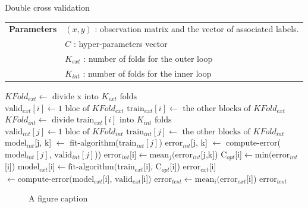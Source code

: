 \documentclass[a4paper,12pt,oneside,final]{report}
\newenvironment{changemargin}[2]{\begin{list}{}{%
\setlength{\topsep}{0pt}%
\setlength{\leftmargin}{0pt}%
\setlength{\rightmargin}{0pt}%
\setlength{\listparindent}{\parindent}%
\setlength{\itemindent}{\parindent}%
\setlength{\parsep}{0pt plus 1pt}%
\addtolength{\leftmargin}{#1}%
\addtolength{\rightmargin}{#2}%
}\item }{\end{list}}
\begin{document}
\begin{algorithm}[H]
     \caption{\small Double cross validation}
     \label{alg:double_cross_val} 
     \begin{algorithmic}
       \STATE \begin{tabular}{@{\hspace{0cm}}p{1.4cm}l}
       \textbf{Parameters}  & $(x, y)$ : observation matrix and the vector of associated labels.\\
           & $C$ : hyper-parameters vector\\
           & $K_{ext}$ : number of folds for the outer loop\\
           & $K_{int}$ : number of folds for the inner loop\\
       \end{tabular}
       \STATE $KFold_{ext} \leftarrow \text{ divide x into } K_{ext} \text{ folds}$\\
         \STATE $\text{valid}_{ext}[i] \leftarrow 1 \text{ bloc of } KFold_{ext}$
         \STATE $\text{train}_{ext}[i] \leftarrow \text{ the other blocks of } KFold_{ext}$
         \STATE $KFold_{int} \leftarrow \text{ divide train}_{ext}[i] \text{ into } K_{int} \text{ folds}$\\
            \STATE $\text{valid}_{int}[j] \leftarrow 1 \text{ bloc of } KFold_{int}$
            \STATE $\text{train}_{int}[j] \leftarrow \text{ the other blocks of } KFold_{int}$
               \STATE $\text{model}_{int}$[j, k] $\leftarrow$ fit-algorithm($\text{train}_{int}[j]$)
               \STATE $\text{error}_{int}$[j, k] $\leftarrow$ compute-error($\text{model}_{int}[j]$, $\text{valid}_{int}[j]$))
            \ENDFOR
         \ENDFOR
         \STATE $\text{error}_{int}$[i]$ \leftarrow  \text{mean}_j( \text{error}_{int}$[j,k])
         \STATE $\text{C}_{opt}$[i]$     \leftarrow  \text{min}( \text{error}_{int}$[i])
         \STATE $\text{model}_{ext}$[i]$ \leftarrow  \text{fit-algorithm}( \text{train}_{ext}$[i], $\text{C}_{opt}$[i])
         \STATE $\text{error}_{ext}$[i]$ \leftarrow  \text{compute-error}( \text{model}_{ext}$[i], $\text{valid}_{ext}$[i])
     \ENDFOR 
     \STATE $\text{error}_{test} \leftarrow  \text{mean}_i( \text{error}_{ext}$[i])
     \RETURN $\text{error}_{test}$ 
     \end{algorithmic}
   \end{algorithm}


\begin{figure}[!h]
\begin{changemargin}{-20mm}{-20mm}
\center
\caption{A figure caption}
\end{changemargin}
\end{figure}
\end{document}
